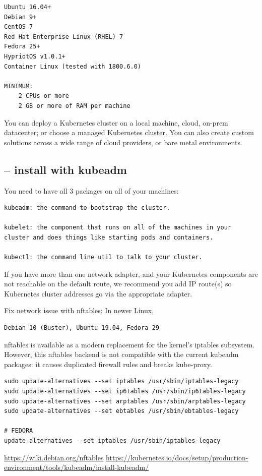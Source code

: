 \begin{verbatim}
Ubuntu 16.04+
Debian 9+
CentOS 7
Red Hat Enterprise Linux (RHEL) 7
Fedora 25+
HypriotOS v1.0.1+
Container Linux (tested with 1800.6.0)

MINIMUM:
	2 CPUs or more
	2 GB or more of RAM per machine
\end{verbatim}

You can deploy a Kubernetes cluster on a local machine, cloud, on-prem
datacenter; or choose a managed Kubernetes cluster. You can also create custom
solutions across a wide range of cloud providers, or bare metal environments.

\subsection{-- install with kubeadm}

You need to have all 3 packages on all of your machines:
\begin{verbatim}
kubeadm: the command to bootstrap the cluster.

kubelet: the component that runs on all of the machines in your cluster and does things like starting pods and containers.

kubectl: the command line util to talk to your cluster.
\end{verbatim}


If you have more than one network adapter, and your Kubernetes components are
not reachable on the default route, we recommend you add IP route(s) so
Kubernetes cluster addresses go via the appropriate adapter.

Fix network issue with nftables:
In newer Linux, 
\begin{verbatim}
Debian 10 (Buster), Ubuntu 19.04, Fedora 29 
\end{verbatim}
nftables is available as a modern replacement for the kernel’s iptables subsystem.
However,  this nftables backend is not compatible with the current kubeadm
packages: it causes duplicated firewall rules and breaks kube-proxy.
\begin{verbatim}
sudo update-alternatives --set iptables /usr/sbin/iptables-legacy
sudo update-alternatives --set ip6tables /usr/sbin/ip6tables-legacy
sudo update-alternatives --set arptables /usr/sbin/arptables-legacy
sudo update-alternatives --set ebtables /usr/sbin/ebtables-legacy

# FEDORA
update-alternatives --set iptables /usr/sbin/iptables-legacy
\end{verbatim}
\url{https://wiki.debian.org/nftables}
\url{https://kubernetes.io/docs/setup/production-environment/tools/kubeadm/install-kubeadm/}

